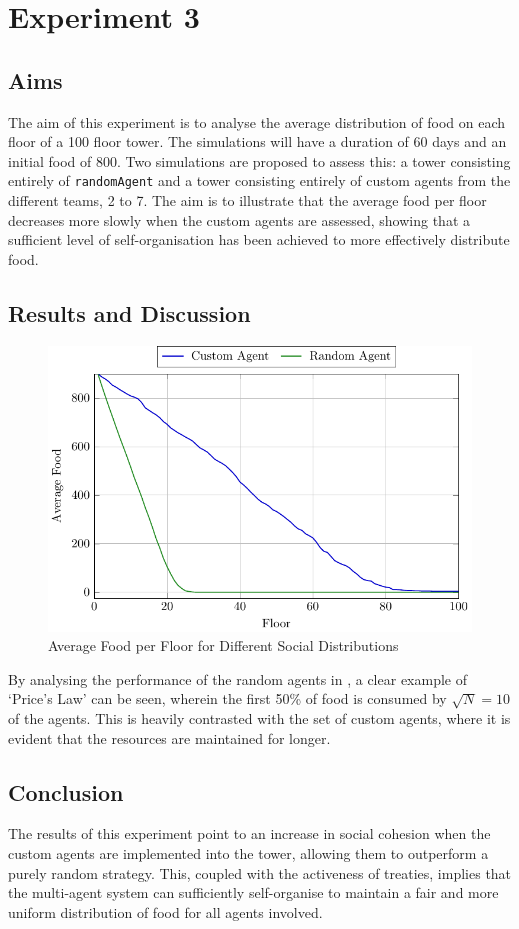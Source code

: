 \section{Experiment 3}
\label{sec: Experiment 3}
\subsection{Aims}
\label{subsec: E3-Aims}
The aim of this experiment is to analyse the average distribution of food on each floor of a 100 floor tower.
The simulations will have a duration of 60 days and an initial food of 800. Two simulations are proposed to assess this: a tower consisting entirely of \texttt{randomAgent} and a tower consisting entirely of custom agents from the different teams, 2 to 7. The aim is to illustrate that the average food per floor decreases more slowly when the custom agents are assessed, showing that a sufficient level of self-organisation has been achieved to more effectively distribute food.

\subsection{Results and Discussion}
\label{subsec: E3-Results and Discussion}
\begin{figure}[H]
    \centering
    \includegraphics[width=.8\linewidth]{010_experiments/images/SOMAS_price.pdf}
    \caption{Average Food per Floor for Different Social Distributions}
    \label{fig:priceLaw}
\end{figure}

By analysing the performance of the random agents in , a clear example of `Price's Law' can be seen, wherein the first 50\% of food is consumed by $\sqrt{\mathit{N}} = 10$ of the agents. This is heavily contrasted with the set of custom agents, where it is evident that the resources are maintained for longer. 

\subsection{Conclusion}
\label{subsec: E3-Conclusion}
The results of this experiment point to an increase in social cohesion when the custom agents are implemented into the tower, allowing them to outperform a purely random strategy. This, coupled with the activeness of treaties, implies that the multi-agent system can sufficiently self-organise to maintain a fair and more uniform distribution of food for all agents involved. 

